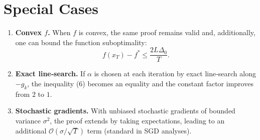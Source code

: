 \documentclass{article}
\begin{document}
\section*{Special Cases}
\begin{enumerate}
\item \textbf{Convex $f$.} When $f$ is convex, the same proof remains valid and, additionally, one can bound the function suboptimality:
\[
f(x_T)-f^* \le \frac{2L\Delta_0}{T}.
\]
\item \textbf{Exact line‑search.} If $\alpha$ is chosen at each iteration by exact line‑search along $-g_k$, the inequality (6) becomes an equality and the constant factor improves from $2$ to $1$.
\item \textbf{Stochastic gradients.} With unbiased stochastic gradients of bounded variance $\sigma^2$, the proof extends by taking expectations, leading to an additional $\mathcal{O}(\sigma/\sqrt{T})$ term (standard in SGD analyses).
\end{enumerate}
\end{document}
